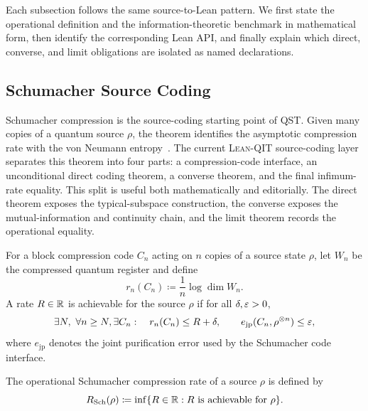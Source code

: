 \documentclass[10pt,a4paper]{article}
\DeclareRobustCommand{\LeanQIT}{\textnormal{\textsc{Lean-QIT}}}
\begin{document}
	
Each subsection follows the same source-to-Lean pattern.  We first state the operational definition and the information-theoretic benchmark in mathematical form, then identify the corresponding Lean API, and finally explain which
direct, converse, and limit obligations are isolated as named declarations.

\subsection{Schumacher Source Coding}
\label{sec:source-coding}

Schumacher compression is the source-coding starting point of QST. Given many copies of a quantum source $\rho$, the theorem identifies the asymptotic
compression rate with the von Neumann entropy~\cite{Schumacher1995}.  The current \LeanQIT{} source-coding layer separates
this theorem into four parts: a compression-code interface, an
unconditional direct coding theorem, a converse theorem, and the final
infimum-rate equality.  This split is useful both mathematically and
editorially.  The direct theorem exposes the typical-subspace construction,
the converse exposes the mutual-information and continuity chain, and the
limit theorem records the operational equality.

For a block compression code $C_n$ acting on $n$ copies of a source state $\rho$, let $W_n$ be the compressed quantum register and define
\begin{equation}
    r_n(C_n)\coloneqq\frac{1}{n}\log \dim W_n .
\end{equation}
A rate $R\in{{\mathbb R}}$ is achievable for the source $\rho$ if for all $\delta, \varepsilon>0$,
\begin{equation}
    \begin{aligned}
        \exists N,\ \forall n\ge N,
        \exists C_n:\quad
        r_n(C_n)\le R+\delta,\qquad
        e_{\mathrm{jp}}(C_n,\rho^{\otimes n})\le \varepsilon ,
    \end{aligned}
\end{equation}
where $e_{\mathrm{jp}}$ denotes the joint purification error used by the
Schumacher code interface.

\begin{definition}
    \label{def:schumacher-compression-rate}
    The operational Schumacher compression rate of a source $\rho$ is defined by
    \begin{equation}
        R_{\mathrm{Sch}}(\rho) \coloneqq \inf\{R\in{{\mathbb R}}: R\ \mathrm{is~achievable~for~ }\rho\}.
    \end{equation}
\end{definition}
\end{document}
